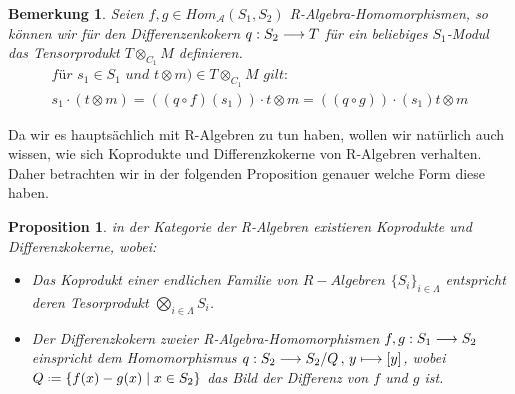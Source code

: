 \documentclass[10pt,a4paper]{report}
\newcounter{Aussage}[chapter]
\newtheorem{prop}[Aussage]{Proposition}
\newtheorem{bem}[Aussage]{Bemerkung}
\newcommand{\functionfront}[3]{\nolinebreak{#1:#2 \longrightarrow #3}}
\newcommand{\function}[5]{\nolinebreak{#1:#2 \longrightarrow #3 \, , \, #4 \longmapsto #5}}
\newcommand{\Tensor}[3]{#1 \otimes_{#2} #3}
\newcommand{\tensor}[3]{#1 \otimes #3}
\newcommand*{\defeq}{\mathrel{\vcenter{\baselineskip0.5ex \lineskiplimit0pt
                     \hbox{\scriptsize.}\hbox{\scriptsize.}}}%
                     =}
\begin{document}
\begin{bem}
Seien $f,g \in Hom_{\mathcal{A}}(S_1,S_2)$ R-Algebra-Homomorphismen, so können wir für den Differenzenkokern $\functionfront{q}{S_2}{T}$ für ein beliebiges $S_1$-Modul das Tensorprodukt $\Tensor{T}{C_1}{M}$ definieren. 
\begin{gather*}
\textit{für } s_1 \in S_1 \textit{ und } \tensor{t}{S_1}{m}) \in \Tensor{T}{C_1}{M} \textit{ gilt: }\\
s_1 \cdot (\tensor{t}{S_1}{m}) = \tensor{((q \circ f)(s_1)) \cdot t}{S_1}{m} = \tensor{((q \circ g)) \cdot (s_1)t}{S_1}{m}
\end{gather*}
\end{bem}


Da wir es hauptsächlich mit R-Algebren zu tun haben, wollen wir natürlich auch wissen, wie sich Koprodukte und Differenzkokerne von R-Algebren verhalten. Daher betrachten wir in der folgenden Proposition genauer welche Form diese haben.
\begin{prop} \label{R-Algebra-Kolimiten}
in der Kategorie der R-Algebren existieren Koprodukte und Differenzkokerne, wobei:
\begin{itemize}
\item[\textbf{1.}] Das Koprodukt einer endlichen Familie von $R-Algebren$ $\lbrace S_i \rbrace_{i \in \Lambda}$ entspricht deren Tesorprodukt $\bigotimes_{i \in \Lambda} S_i$. 
\item[\textbf{2.}] Der Differenzkokern zweier R-Algebra-Homomorphismen $\functionfront{f,g}{S_1}{S_2}$ einspricht dem Homomorphismus $\function{q}{S_2}{S_2/Q}{y}{[y]}$, wobei $Q \defeq \lbrace f(x) - g(x)\mid x \in S_2 \rbrace$ das Bild der Differenz von $f$ und $g$ ist.
\end{itemize}
\end{prop}
\end{document}
